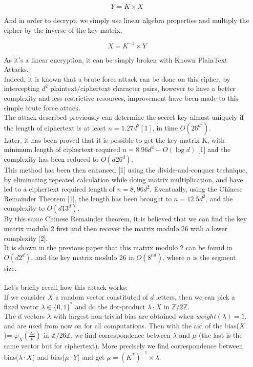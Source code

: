 \documentclass{article}
\begin{document}
$$Y=K \times X$$

And in order to decrypt, we simply use linear algebra properties and multiply the cipher by the inverse of the key matrix.

$$X = K^{-1} \times Y$$

As it's a linear encryption, it can be simply broken with Known PlainText Attacks.\\
Indeed, it is known that a brute force attack can be done on this cipher, by intercepting $d^2$ plaintext/ciphertext character pairs, however to have a better complexity and less restrictive resources, improvement have been made to this simple brute force attack.\\
The attack described previously can determine the secret key almost uniquely if the length of ciphertext is at least $n =1.27d^2 [1]$, in time $O(26^{d^2})$.\\ 
Later, it has been proved that it is possible to get the key matrix K, with minimum length of ciphertext required $n =8.96d^2 -O(\log d)$ [1] and the complexity has been reduced to $O(d26^d)$.\\
This method has been then enhanced [1] using the divide-and-conquer technique, by eliminating repeated calculation while doing matrix multiplication, and have led to a ciphertext required length of $n=8,96d^2$. Eventually, using the Chinese Remainder Theorem [1], the length has been brought to $n=12.5d^2$, and the complexity to $O(d13^d)$.\\
By this same Chinese Remainder theorem, it is believed that we can find the key matrix modulo 2 first and then recover the matrix modulo 26 with a lower complexity [2].\\
It is shown in the previous paper that this matrix modulo 2 can be found in $O(d2^d)$, and the key matrix modulo 26 in $O(8^{nd})$, where $n$ is the segment size.\\
\\
Let's briefly recall how this attack works:\\
If we consider $X$ a random vector constituted of $d$ letters, then we can pick a fixed vector $\lambda \in \{0,1\}^*$ and do the dot-product $\lambda \cdot X$ in $\mathbb{Z}/2\mathbb{Z}$.\\
The $d$ vectors $\lambda$ with largest non-trivial bias are obtained when $weight(\lambda) = 1$, and are used from now on for all computations.
Then with the aid of the bias($X$)= $\varphi_{X}(\frac{2\pi}{p})$ in $\mathbb{Z}/26\mathbb{Z}$, we find correspondence between $\lambda$ and $\mu$ (the last is the same vector but for ciphertext). More precisely we find correspondence between bias($\lambda \cdot X$) and bias($\mu \cdot Y$) and get $ \mu = (K^T)^{-1} \times\lambda $.\\
\end{document}
